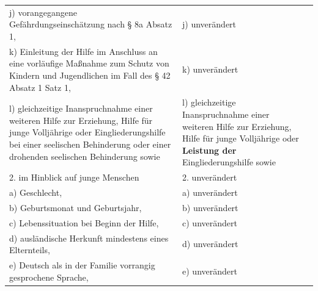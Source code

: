 \documentclass[10pt,a4paper,landscape]{article}
\begin{document}
\begin{longtable}{|L{8.2cm}|L{8.2cm}|L{8.2cm}|}
\hhline{|---|}
j)   \newline vorangegangene  \newline Gefährdungseinschätzung nach \S{} 8a  \newline Absatz 1, & j) unverändert &  \\
\hhline{|---|}
k)   \newline Einleitung der Hilfe im Anschluss an eine  \newline vorläufige Maßnahme zum Schutz von  \newline Kindern und Jugendlichen im Fall des \S{} 42  \newline Absatz 1 Satz 1, & k) unverändert &  \\
\hhline{|---|}
l)   \newline gleichzeitige Inanspruchnahme einer  \newline weiteren Hilfe zur Erziehung, Hilfe für junge  \newline Volljährige oder Eingliederungshilfe bei  \newline einer seelischen Behinderung oder einer  \newline drohenden seelischen Behinderung sowie & l)   \newline gleichzeitige Inanspruchnahme einer  \newline weiteren Hilfe zur Erziehung, Hilfe für junge  \newline Volljährige oder \textbf{\textcolor{diffred}{Leistung der}}  \newline Eingliederungshilfe sowie &  \\
\hhline{|---|}
2. im Hinblick auf junge Menschen & 2. unverändert &  \\
\hhline{|---|}
a)   \newline Geschlecht, & a) unverändert &  \\
\hhline{|---|}
b)   \newline Geburtsmonat und Geburtsjahr, & b) unverändert &  \\
\hhline{|---|}
c)   \newline Lebenssituation bei Beginn der Hilfe, & c) unverändert &  \\
\hhline{|---|}
d)   \newline ausländische Herkunft mindestens eines  \newline Elternteils, & d) unverändert &  \\
\hhline{|---|}
e)   \newline Deutsch als in der Familie vorrangig  \newline gesprochene Sprache, & e) unverändert &  \\

\end{longtable}
\end{document}
